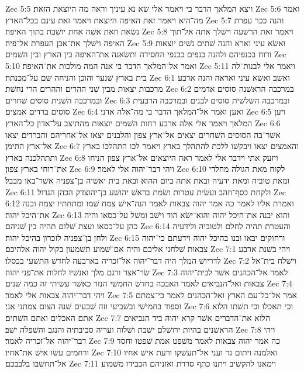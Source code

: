Zec 5:5  ויצא המלאך הדבר בי ויאמר אלי שׂא נא עיניך וראה מה היוצאת הזאת׃
Zec 5:6  ואמר מה־היא ויאמר זאת האיפה היוצאת ויאמר זאת עינם בכל־הארץ׃
Zec 5:7  והנה ככר עפרת נשׂאת וזאת אשׁה אחת יושׁבת בתוך האיפה׃
Zec 5:8  ויאמר זאת הרשׁעה וישׁלך אתה אל־תוך האיפה וישׁלך את־אבן העפרת אל־פיה׃
Zec 5:9  ואשׂא עיני וארא והנה שׁתים נשׁים יוצאות ורוח בכנפיהם ולהנה כנפים ככנפי החסידה ותשׂאנה את־האיפה בין הארץ ובין השׁמים׃
Zec 5:10  ואמר אל־המלאך הדבר בי אנה המה מולכות את־האיפה׃
Zec 5:11  ויאמר אלי לבנות־לה בית בארץ שׁנער והוכן והניחה שׁם על־מכנתה׃
Zec 6:1  ואשׁב ואשׂא עיני ואראה והנה ארבע מרכבות יצאות מבין שׁני ההרים וההרים הרי נחשׁת׃
Zec 6:2  במרכבה הראשׁנה סוסים אדמים ובמרכבה השׁנית סוסים שׁחרים׃
Zec 6:3  ובמרכבה השׁלשׁית סוסים לבנים ובמרכבה הרבעית סוסים ברדים אמצים׃
Zec 6:4  ואען ואמר אל־המלאך הדבר בי מה־אלה אדני׃
Zec 6:5  ויען המלאך ויאמר אלי אלה ארבע רחות השׁמים יוצאות מהתיצב על־אדון כל־הארץ׃
Zec 6:6  אשׁר־בה הסוסים השׁחרים יצאים אל־ארץ צפון והלבנים יצאו אל־אחריהם והברדים יצאו אל־ארץ התימן׃
Zec 6:7  והאמצים יצאו ויבקשׁו ללכת להתהלך בארץ ויאמר לכו התהלכו בארץ ותתהלכנה בארץ׃
Zec 6:8  ויזעק אתי וידבר אלי לאמר ראה היוצאים אל־ארץ צפון הניחו את־רוחי בארץ צפון׃
Zec 6:9  ויהי דבר־יהוה אלי לאמר׃
Zec 6:10  לקוח מאת הגולה מחלדי ומאת טוביה ומאת ידעיה ובאת אתה ביום ההוא ובאת בית יאשׁיה בן־צפניה אשׁר־באו מבבל׃
Zec 6:11  ולקחת כסף־וזהב ועשׂית עטרות ושׂמת בראשׁ יהושׁע בן־יהוצדק הכהן הגדול׃
Zec 6:12  ואמרת אליו לאמר כה אמר יהוה צבאות לאמר הנה־אישׁ צמח שׁמו ומתחתיו יצמח ובנה את־היכל יהוה׃
Zec 6:13  והוא יבנה את־היכל יהוה והוא־ישׂא הוד וישׁב ומשׁל על־כסאו והיה כהן על־כסאו ועצת שׁלום תהיה בין שׁניהם׃
Zec 6:14  והעטרת תהיה לחלם ולטוביה ולידעיה ולחן בן־צפניה לזכרון בהיכל יהוה׃
Zec 6:15  ורחוקים יבאו ובנו בהיכל יהוה וידעתם כי־יהוה צבאות שׁלחני אליכם והיה אם־שׁמוע תשׁמעון בקול יהוה אלהיכם׃
Zec 7:1  ויהי בשׁנת ארבע לדריושׁ המלך היה דבר־יהוה אל־זכריה בארבעה לחדשׁ התשׁעי בכסלו׃
Zec 7:2  וישׁלח בית־אל שׂר־אצר ורגם מלך ואנשׁיו לחלות את־פני יהוה׃
Zec 7:3  לאמר אל־הכהנים אשׁר לבית־יהוה צבאות ואל־הנביאים לאמר האבכה בחדשׁ החמשׁי הנזר כאשׁר עשׂיתי זה כמה שׁנים׃
Zec 7:4  ויהי דבר־יהוה צבאות אלי לאמר׃
Zec 7:5  אמר אל־כל־עם הארץ ואל־הכהנים לאמר כי־צמתם וספוד בחמישׁי ובשׁביעי וזה שׁבעים שׁנה הצום צמתני אני׃
Zec 7:6  וכי תאכלו וכי תשׁתו הלוא אתם האכלים ואתם השׁתים׃
Zec 7:7  הלוא את־הדברים אשׁר קרא יהוה ביד הנביאים הראשׁנים בהיות ירושׁלם ישׁבת ושׁלוה ועריה סביבתיה והנגב והשׁפלה ישׁב׃
Zec 7:8  ויהי דבר־יהוה אל־זכריה לאמר׃
Zec 7:9  כה אמר יהוה צבאות לאמר משׁפט אמת שׁפטו וחסד ורחמים עשׂו אישׁ את־אחיו׃
Zec 7:10  ואלמנה ויתום גר ועני אל־תעשׁקו ורעת אישׁ אחיו אל־תחשׁבו בלבבכם׃
Zec 7:11  וימאנו להקשׁיב ויתנו כתף סררת ואזניהם הכבידו משׁמוע׃

